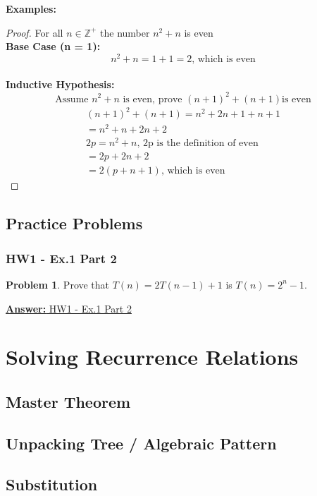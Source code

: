 \documentclass[12pt]{article}
\theoremstyle{definition}
\newtheorem{practiceproblem}{Problem}[section]
\def\scratchwork{\vspace*{15em}} %
\def\ghbase{https://github.com/zacktraczyk/CSE102-Midterm-Study-Guide/blob/main/hw\%20answers/}
\newenvironment{problem}[2]
{
	\def\linktext{#1}
	\def\linkdest{\ghbase#2}
	\noindent \begin{minipage}{\textwidth}
		\begin{practiceproblem}
}
{	
		\end{practiceproblem}
		\scratchwork

		\href{\linkdest}{\textbf{Answer:} \linktext}
	\end{minipage}
}
\def\psetone{vaggos\_W\_24\_CSE102\_01\_PSET\_1\_Solutions.pdf}
\begin{document}
	\noindent \textbf{Examples:}

	\begin{proof} For all $n \in \mathbb{Z}^+$ the number $n^2 + n$ is even \\
		\textbf{Base Case (n = 1):} 
		$$n^2 + n = 1 + 1 = 2\text{, which is even}$$ \\
		\textbf{Inductive Hypothesis:}
		$$\text{Assume }n^2 + n\text{ is even, prove }(n + 1)^2 + (n + 1)\text{
		is even}$$
		\begin{gather}
			(n + 1)^2 + (n + 1) = n^2 + 2n + 1 + n + 1 \\
			= n^2 + n + 2n + 2 \\
			2p = n^2 + n\text{, 2p is the definition of even} \\
			= 2p + 2n + 2 \\
			= 2(p + n + 1)\text{, which is even}
		\end{gather}
	\end{proof}


	\subsection{Practice Problems}

	\subsubsection{HW1 - Ex.1 Part 2}

	\begin{problem}{HW1 - Ex.1 Part 2}{\psetone}
		Prove that $T(n) = 2T(n - 1) + 1$ is $T(n) = 2^n - 1$.
	\end{problem}


	\section{Solving Recurrence Relations}

	\subsection{Master Theorem}

	\subsection{Unpacking Tree / Algebraic Pattern}

	\subsection{Substitution}
\end{document}
